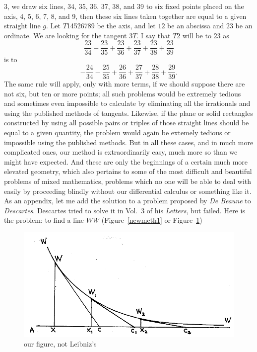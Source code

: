 \documentclass[twoside,openright]{article}
\begin{document}
3, we draw six lines, 34, 35, 36, 37, 38, and 39 to six fixed points
placed on the axis, 4, 5, 6, 7, 8, and 9, then these six lines taken
together are equal to a given straight line $g$.  Let $T$14526789 be
the axis, and let $12$ be an abscissa and $23$ be an ordinate.  We are
looking for the tangent $3T$.  I say that $T2$ will be to $23$
as
$$\frac{23}{34} + \frac{23}{35} +\frac{23}{36} + \frac{23}{37} + \frac{23}{38}
+\frac{23}{39}$$ is to
$$-\frac{24}{34} - \frac{25}{35} +\frac{26}{36} +\frac{27}{37} + \frac{28}{38}
+ \frac{29}{39}.$$ The same rule will apply, only with more terms, if we
should suppose there are not six, but ten or more points; all such problems would be
extremely tedious and sometimes even impossible to calculate by eliminating
all the irrationals and using the published methods of tangents.  Likewise, if 
the plane or solid rectangles constructed by using all possible pairs or
triples of those straight lines should be equal to a given quantity, the problem would again be extemely tedious or impossible using the published methods.\label{enmex3}    But in all these cases, and in much more complicated ones, our method is
extraordinarily easy, much more so than we might have expected.  And these are
only the beginnings of a certain much more elevated geometry, which also
pertains to some of the most difficult and beautiful problems of mixed
mathematics, problems which no one will be able to deal with easily by
proceeding blindly without our differential calculus or something like it.  \label{begdeb} As
an appendix, let me add the solution to a problem proposed by {\em De Beaune}
to {\em Descartes}.  Descartes tried to solve it in Vol.\ 3 of his {\em
Letters}, but failed.  Here is the problem: to find a line $WW$ (Figure~\ref{newmeth1} or Figure~\ref{debeaune})
\begin{figure}[htp]
\begin{center}
\includegraphics[width=.8\textwidth]{fig/Figure26}
\caption{our figure, not Leibniz's}
\label{debeaune}
\end{center}
\end{figure} 
\end{document}

